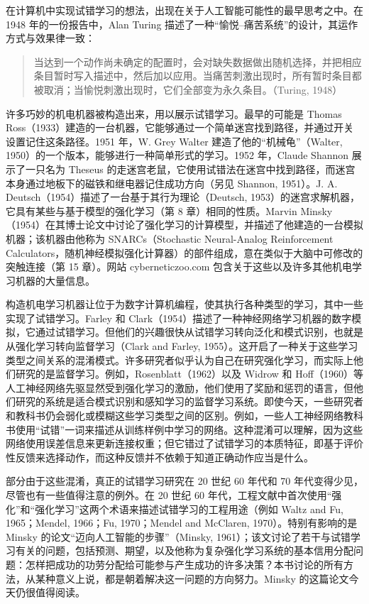 \documentclass[UTF8, 12pt, fontset=fandol, oneside]{ctexart}
\begin{document}
在计算机中实现试错学习的想法，出现在关于人工智能可能性的最早思考之中。在 1948 年的一份报告中，Alan Turing 描述了一种“愉悦--痛苦系统”的设计，其运作方式与效果律一致：

\begin{quote}
当达到一个动作尚未确定的配置时，会对缺失数据做出随机选择，并把相应条目暂时写入描述中，然后加以应用。当痛苦刺激出现时，所有暂时条目都被取消；当愉悦刺激出现时，它们全部变为永久条目。（Turing, 1948）
\end{quote}

许多巧妙的机电机器被构造出来，用以展示试错学习。最早的可能是 Thomas Ross（1933）建造的一台机器，它能够通过一个简单迷宫找到路径，并通过开关设置记住这条路径。1951 年，W. Grey Walter 建造了他的“机械龟”（Walter, 1950）的一个版本，能够进行一种简单形式的学习。1952 年，Claude Shannon 展示了一只名为 Theseus 的走迷宫老鼠，它使用试错法在迷宫中找到路径，而迷宫本身通过地板下的磁铁和继电器记住成功方向（另见 Shannon, 1951）。J. A. Deutsch（1954）描述了一台基于其行为理论（Deutsch, 1953）的迷宫求解机器，它具有某些与基于模型的强化学习（第 8 章）相同的性质。Marvin Minsky（1954）在其博士论文中讨论了强化学习的计算模型，并描述了他建造的一台模拟机器；该机器由他称为 SNARCs（Stochastic Neural-Analog Reinforcement Calculators，随机神经模拟强化计算器）的部件组成，意在类似于大脑中可修改的突触连接（第 15 章）。网站 cyberneticzoo.com 包含关于这些以及许多其他机电学习机器的大量信息。

构造机电学习机器让位于为数字计算机编程，使其执行各种类型的学习，其中一些实现了试错学习。Farley 和 Clark（1954）描述了一种神经网络学习机器的数字模拟，它通过试错学习。但他们的兴趣很快从试错学习转向泛化和模式识别，也就是从强化学习转向监督学习（Clark and Farley, 1955）。这开启了一种关于这些学习类型之间关系的混淆模式。许多研究者似乎认为自己在研究强化学习，而实际上他们研究的是监督学习。例如，Rosenblatt（1962）以及 Widrow 和 Hoff（1960）等人工神经网络先驱显然受到强化学习的激励，他们使用了奖励和惩罚的语言，但他们研究的系统是适合模式识别和感知学习的监督学习系统。即使今天，一些研究者和教科书仍会弱化或模糊这些学习类型之间的区别。例如，一些人工神经网络教科书使用“试错”一词来描述从训练样例中学习的网络。这种混淆可以理解，因为这些网络使用误差信息来更新连接权重；但它错过了试错学习的本质特征，即基于评价性反馈来选择动作，而这种反馈并不依赖于知道正确动作应当是什么。

部分由于这些混淆，真正的试错学习研究在 20 世纪 60 年代和 70 年代变得少见，尽管也有一些值得注意的例外。在 20 世纪 60 年代，工程文献中首次使用“强化”和“强化学习”这两个术语来描述试错学习的工程用途（例如 Waltz and Fu, 1965；Mendel, 1966；Fu, 1970；Mendel and McClaren, 1970）。特别有影响的是 Minsky 的论文“迈向人工智能的步骤”（Minsky, 1961）；该文讨论了若干与试错学习有关的问题，包括预测、期望，以及他称为复杂强化学习系统的基本信用分配问题：怎样把成功的功劳分配给可能参与产生成功的许多决策？本书讨论的所有方法，从某种意义上说，都是朝着解决这一问题的方向努力。Minsky 的这篇论文今天仍很值得阅读。
\end{document}
